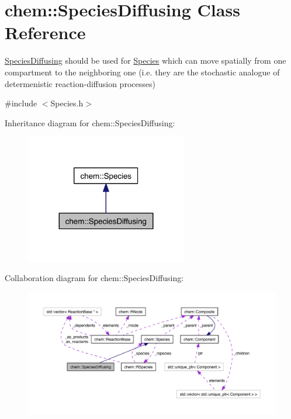 \hypertarget{classchem_1_1SpeciesDiffusing}{\section{chem\-:\-:Species\-Diffusing Class Reference}
\label{classchem_1_1SpeciesDiffusing}
}


\hyperlink{classchem_1_1SpeciesDiffusing}{Species\-Diffusing} should be used for \hyperlink{classchem_1_1Species}{Species} which can move spatially from one compartment to the neighboring one (i.\-e. they are the stochastic analogue of determenistic reaction-\/diffusion processes)  




{\ttfamily \#include $<$Species.\-h$>$}



Inheritance diagram for chem\-:\-:Species\-Diffusing\-:\nopagebreak
\begin{figure}[H]
\begin{center}
\leavevmode
\includegraphics[width=200pt]{classchem_1_1SpeciesDiffusing__inherit__graph}
\end{center}
\end{figure}


Collaboration diagram for chem\-:\-:Species\-Diffusing\-:\nopagebreak
\begin{figure}[H]
\begin{center}
\leavevmode
\includegraphics[width=350pt]{classchem_1_1SpeciesDiffusing__coll__graph}
\end{center}
\end{figure}
